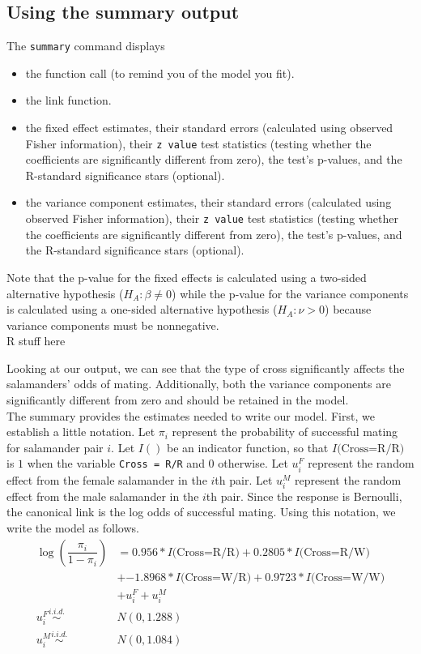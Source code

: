 \documentclass[article]{jss}
\begin{document}
\subsection{Using the summary output}
The \texttt{summary} command displays
\begin{itemize}
\item the function call (to remind you of the model you fit).
\item the link function.
\item the fixed effect estimates, their standard errors (calculated using observed Fisher information), their \texttt{z value} test statistics (testing whether the coefficients are significantly different from zero), the test's p-values, and the R-standard significance stars (optional).
\item the variance component estimates, their standard errors (calculated using observed Fisher information), their \texttt{z value} test statistics (testing whether the coefficients are significantly different from zero), the test's p-values, and the R-standard significance stars (optional).
\end{itemize}



Note that the p-value for the fixed effects is calculated using a two-sided alternative hypothesis ($H_A: \beta \neq 0$) while the p-value for the variance components is calculated using a one-sided alternative hypothesis ($H_A: \nu >0$) because variance components must be nonnegative.\\


R stuff here

Looking at our output, we can see that the type of cross significantly affects the salamanders' odds of mating. Additionally, both the variance components are significantly different from zero and should be retained in the model.\\

The summary provides the estimates needed to write our model. First, we establish a little notation. Let $\pi_i$ represent the probability of successful mating for salamander pair $i$. Let $I()$ be an indicator function, so that $I\text{(Cross=R/R)}$ is $1$ when the variable \texttt{Cross = R/R} and 0 otherwise. Let $u_i^F$ represent the random effect from the female salamander in the $i$th pair. Let $u_i^M$ represent the random effect from the male salamander in the $i$th pair. Since the response is Bernoulli, the canonical link is the log odds of successful mating. Using this notation, we write the model as follows.\\
\begin{align*}
\log \left( \dfrac{\pi_i}{1-\pi_i} \right) &= 0.956 * I\text{(Cross=R/R)} + 0.2805 * I\text{(Cross=R/W)}\\
 &+ \ensuremath{-1.8968} * I\text{(Cross=W/R)}
+ 0.9723 * I\text{(Cross=W/W)}\\
 &+ u_i^F+u_i^M\\
u_i^F \overset{i.i.d.}{\sim} &N(0,1.288)\\
u_i^M \overset{i.i.d.}{\sim} &N(0,1.084)\\
\end{align*}
\end{document}
